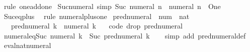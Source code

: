 \begin{isabellebody}
\ {\isacharparenleft}{\kern0pt}rule\ one{\isacharunderscore}{\kern0pt}add{\isacharunderscore}{\kern0pt}one{\isacharparenright}{\kern0pt}%
\endisatagproof
{\isafoldproof}%
%
\isadelimproof
\isanewline
%
\endisadelimproof
\isanewline
{}\isamarkupfalse%
\ Suc{\isacharunderscore}{\kern0pt}numeral\ {\isacharbrackleft}{\kern0pt}simp{\isacharbrackright}{\kern0pt}{\isacharcolon}{\kern0pt}\ {\isachardoublequoteopen}Suc\ {\isacharparenleft}{\kern0pt}numeral\ n{\isacharparenright}{\kern0pt}\ {\isacharequal}{\kern0pt}\ numeral\ {\isacharparenleft}{\kern0pt}n\ {\isacharplus}{\kern0pt}\ One{\isacharparenright}{\kern0pt}{\isachardoublequoteclose}\isanewline
%
\isadelimproof
\ \ %
\endisadelimproof
%
\isatagproof
{}\isamarkupfalse%
\ Suc{\isacharunderscore}{\kern0pt}eq{\isacharunderscore}{\kern0pt}plus{}\ \isamarkupfalse%
\ {\isacharparenleft}{\kern0pt}rule\ numeral{\isacharunderscore}{\kern0pt}plus{\isacharunderscore}{\kern0pt}one{\isacharparenright}{\kern0pt}%
\endisatagproof
{\isafoldproof}%
%
\isadelimproof
\isanewline
%
\endisadelimproof
\isanewline
{}\isamarkupfalse%
\ pred{\isacharunderscore}{\kern0pt}numeral\ {\isacharcolon}{\kern0pt}{\isacharcolon}{\kern0pt}\ {\isachardoublequoteopen}num\ {\isasymRightarrow}\ nat{\isachardoublequoteclose}\isanewline
\ \ \ {\isachardoublequoteopen}pred{\isacharunderscore}{\kern0pt}numeral\ k\ {\isacharequal}{\kern0pt}\ numeral\ k\ {\isacharminus}{\kern0pt}\ {}{\isachardoublequoteclose}\isanewline
\isanewline
{}\isamarkupfalse%
\ {\isacharbrackleft}{\kern0pt}{\isacharbrackleft}{\kern0pt}code\ drop{\isacharcolon}{\kern0pt}\ pred{\isacharunderscore}{\kern0pt}numeral{\isacharbrackright}{\kern0pt}{\isacharbrackright}{\kern0pt}\isanewline
\isanewline
{}\isamarkupfalse%
\ numeral{\isacharunderscore}{\kern0pt}eq{\isacharunderscore}{\kern0pt}Suc{\isacharcolon}{\kern0pt}\ {\isachardoublequoteopen}numeral\ k\ {\isacharequal}{\kern0pt}\ Suc\ {\isacharparenleft}{\kern0pt}pred{\isacharunderscore}{\kern0pt}numeral\ k{\isacharparenright}{\kern0pt}{\isachardoublequoteclose}\isanewline
%
\isadelimproof
\ \ %
\endisadelimproof
%
\isatagproof
{}\isamarkupfalse%
\ {\isacharparenleft}{\kern0pt}simp\ add{\isacharcolon}{\kern0pt}\ pred{\isacharunderscore}{\kern0pt}numeral{\isacharunderscore}{\kern0pt}def{\isacharparenright}{\kern0pt}%
\endisatagproof
{\isafoldproof}%
%
\isadelimproof
\isanewline
%
\endisadelimproof
\isanewline
{}\isamarkupfalse%
\ eval{\isacharunderscore}{\kern0pt}nat{\isacharunderscore}{\kern0pt}numeral{\isacharcolon}{\kern0pt}\isanewline

\end{isabellebody}
